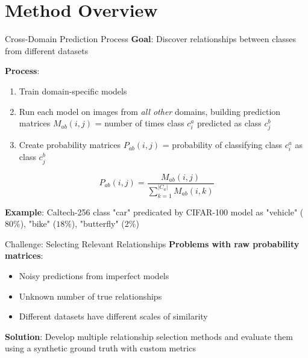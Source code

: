 \documentclass[aspectratio=169]{beamer}
\begin{document}
\section{Method Overview}

\begin{frame}{Cross-Domain Prediction Process}
    \textbf{Goal}: Discover relationships between classes from different datasets

    \vspace{0.5em}

    \textbf{Process}:
    \begin{enumerate}
        \item Train domain-specific models
        \item Run each model on images from \emph{all other} domains, building prediction matrices $M_{ab}(i,j)$ = number of times class $c_i^a$ predicted as class $c_j^b$
        \item Create probability matrices $P_{ab}(i,j)$ = probability of classifying class $c_i^a$ as class $c_j^b$
    \end{enumerate}

    \vspace{0.5em}

    \begin{equation}
        P_{ab}(i, j) = \frac{M_{ab}(i, j)}{\sum_{k=1}^{|C_a|} M_{ab}(i, k)}
    \end{equation}

    \vspace{0.5em}

    \textbf{Example}: Caltech-256 class "car" predicated by CIFAR-100 model as "vehicle" ($80\%$), "bike" ($18\%$), "butterfly" ($2\%$)
\end{frame}

\begin{frame}{Challenge: Selecting Relevant Relationships}
    \textbf{Problems with raw probability matrices}:
    \begin{itemize}
        \item Noisy predictions from imperfect models
        \item Unknown number of true relationships
        \item Different datasets have different scales of similarity
    \end{itemize}

    \vspace{1em}

    \textbf{Solution}: Develop multiple relationship selection methods and evaluate them using a synthetic ground truth with custom metrics
\end{frame}
\end{document}
